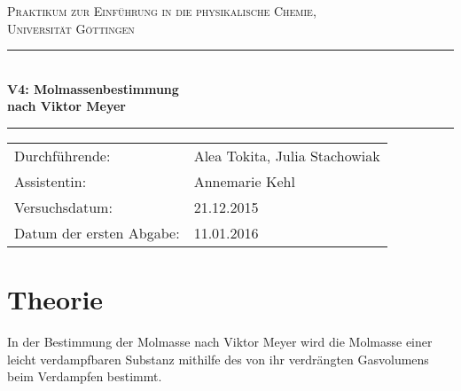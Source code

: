 \documentclass[12pt,a4paper,titlepage,headinclude,bibtotoc]{scrartcl}
\begin{document}
\begin{titlepage}
\centering
\textsc{\Large Praktikum zur Einführung in die physikalische Chemie,\\[1.5ex] Universität Göttingen}

\vspace*{2cm}

\rule{\textwidth}{1pt}\\[0.5cm]
{\huge \bfseries
  V4: Molmassenbestimmung\\[1.5ex]
  nach Viktor Meyer}\\[0.5cm]
\rule{\textwidth}{1pt}

\vspace*{1cm}


\begin{Large}
\begin{tabular}{ll}
Durchführende: &  Alea Tokita, Julia Stachowiak\\
Assistentin: & Annemarie Kehl\\
 Versuchsdatum: & 21.12.2015\\
 Datum der ersten Abgabe: & 11.01.2016
\end{tabular}
\end{Large}

\vspace*{2cm}

\begin{Large}
\end{Large}

\end{titlepage}

\tableofcontents

\newpage
\section{Theorie}
In der Bestimmung der Molmasse nach Viktor Meyer wird die Molmasse einer leicht verdampfbaren Substanz mithilfe des von ihr verdrängten Gasvolumens beim Verdampfen bestimmt.
\end{document}
